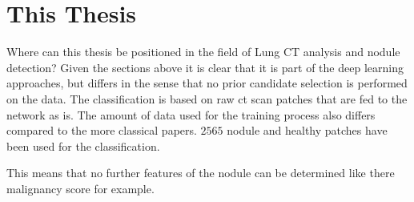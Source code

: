 \documentclass[main.tex]{subfiles}
\begin{document}
\section{This Thesis}
Where can this thesis be positioned in the field of Lung CT analysis and nodule detection? Given the sections above it is clear that it is part of the deep learning approaches, but differs in the sense that no prior candidate selection is performed on the data. The classification is based on raw ct scan patches that are fed to the network as is. The amount of data used for the training process also differs compared to the more classical papers. $2565$ nodule and healthy patches have been used for the classification. 

This means that no further features of the nodule can be determined like there malignancy score for example.
\end{document}
